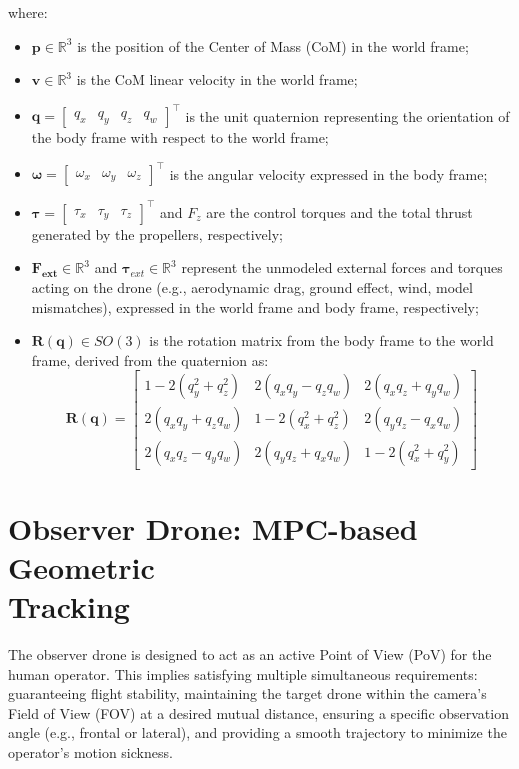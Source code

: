 where:
\begin{itemize}
    \item $\mathbf{p} \in \mathbb{R}^3$ is the position of the Center of Mass (CoM) in the world frame;
    \item $\mathbf{v} \in \mathbb{R}^3$ is the CoM linear velocity in the world frame;
    \item $\mathbf{q} = \begin{bmatrix} q_x & q_y & q_z & q_w \end{bmatrix}^\top$ is the unit quaternion representing the orientation of the body frame with respect to the world frame;
    \item $\boldsymbol{\omega} = \begin{bmatrix} \omega_x & \omega_y & \omega_z \end{bmatrix}^\top$ is the angular velocity expressed in the body frame;
    \item $\boldsymbol{\tau} = \begin{bmatrix} \tau_x & \tau_y & \tau_z \end{bmatrix}^\top$ and $F_z$ are the control torques and the total thrust generated by the propellers, respectively;
    \item $\mathbf{F_{ext}} \in \mathbb{R}^3$ and $\boldsymbol{\tau}_{ext} \in \mathbb{R}^3$ represent the unmodeled external forces and torques acting on the drone (e.g., aerodynamic drag, ground effect, wind, model mismatches), expressed in the world frame and body frame, respectively;
    \item $\mathbf{R}(\mathbf{q}) \in SO(3)$ is the rotation matrix from the body frame to the world frame, derived from the quaternion as:
    \begin{equation}
        \mathbf{R}(\mathbf{q}) = \begin{bmatrix}
        1-2(q_y^2+q_z^2) & 2(q_xq_y-q_zq_w) & 2(q_xq_z+q_yq_w)\\
        2(q_xq_y+q_zq_w) & 1-2(q_x^2+q_z^2) & 2(q_yq_z-q_xq_w)\\
        2(q_xq_z-q_yq_w) & 2(q_yq_z+q_xq_w) & 1-2(q_x^2+q_y^2)
        \end{bmatrix}
    \end{equation}
\end{itemize}

\section{Observer Drone: MPC-based Geometric \\Tracking}
The observer drone is designed to act as an active Point of View (PoV) for the human operator. This implies satisfying multiple simultaneous requirements: guaranteeing flight stability, maintaining the target drone within the camera's Field of View (FOV) at a desired mutual distance, ensuring a specific observation angle (e.g., frontal or lateral), and providing a smooth trajectory to minimize the operator's motion sickness. 

